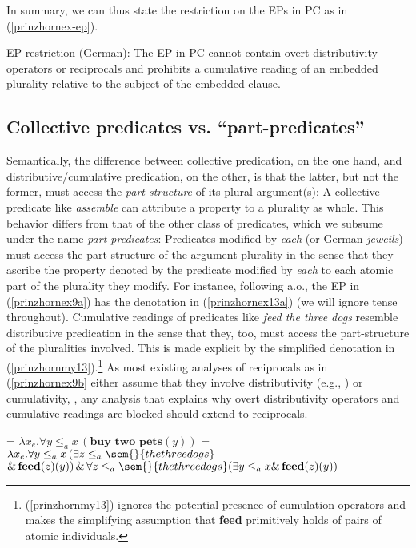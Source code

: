 \documentclass[output=paper,colorlinks,citecolor=brown,
]{langscibook}
\begin{document}
In summary, we can thus state the restriction on the EPs in PC as in (\ref{prinzhornex-ep}).  


\ea EP-restriction (German):  The EP in PC cannot contain overt distributivity operators or reciprocals and prohibits a cumulative reading of an embedded plurality relative to the subject of the embedded clause. \label{prinzhornex-ep} \z

\subsection{Collective predicates vs. “part-predicates”}\label{prinzhornsec:2.2}

Semantically, the difference between collective predication, on the one hand,  and distributive/cumulative predication, on the other, is that the latter, but not the former, must access the {\it part-structure} of its plural argument(s): A collective predicate like {\it assemble} can attribute a property to a plurality as whole. This behavior differs from that of the other class of predicates, which we subsume under the name \textit{part predicates}:  Predicates modified by {\it each} (or German {\it jeweils}) must access the part-structure of the argument plurality in the sense that they ascribe the property denoted by the predicate modified by \textit{each} to each atomic part of the plurality they modify.  For instance, following \citealt{Link:1987} a.o., the EP in (\ref{prinzhornex9a}) has the denotation in (\ref{prinzhornex13a}) (we will ignore tense throughout). Cumulative readings of predicates like \textit{feed the three dogs} resemble distributive predication in the sense that they, too, must access the part-structure of the pluralities involved. This is made explicit by the simplified denotation in (\ref{prinzhornmy13}).\footnote{(\ref{prinzhornmy13}) ignores the potential presence of cumulation operators and makes the simplifying assumption that {\bf feed} primitively holds of pairs of atomic individuals.} 
As most existing analyses of reciprocals as in (\ref{prinzhornex9b} either assume that they involve distributivity (e.g., \citealt{Heim:1991}) or cumulativity, \citep{Beck:2001}, any analysis that explains why overt distributivity operators and cumulative readings are blocked should extend to reciprocals.

\ea	 
\ea {} = $\lambda x_{e}. \forall y \le_{a} x \,(\textbf{buy two pets}(y))$\label{prinzhornex13a}
\ex	{} = $\lambda x_{e}. \forall y \le_{a} x \,(\exists z \le_{a} \sem{}{the three dogs}$\\$ \&\,\textbf{feed}(z)(y)) \,\&\, \forall z \le_{a} \sem{}{the three dogs} (\exists y \le_{a} x \&\, \textbf{feed}(z)(y))$\label{prinzhornmy13}
\z\z
\end{document}
